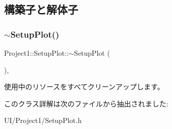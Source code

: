 \subsection{構築子と解体子}
\mbox{\label{class_project1_1_1_setup_plot_a99164cdf31bea63c1f4e01204e381538}} 
\subsubsection{\texorpdfstring{$\sim$\+Setup\+Plot()}{~SetupPlot()}}
{\footnotesize\ttfamily Project1\+::\+Setup\+Plot\+::$\sim$\+Setup\+Plot (\begin{DoxyParamCaption}{ }\end{DoxyParamCaption})\hspace{0.3cm}{\ttfamily [inline]}, {\ttfamily [protected]}}



使用中のリソースをすべてクリーンアップします。 



このクラス詳解は次のファイルから抽出されました\+:\begin{DoxyCompactItemize}
\item 
U\+I/\+Project1/Setup\+Plot.\+h\end{DoxyCompactItemize}
